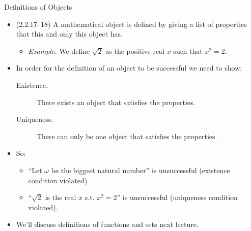 \documentclass[../slides.tex]{subfiles}
\begin{document}
\begin{frame}{Definitions of Objects}

	\begin{itemize}
	
		\item (2.2.17--18) A mathematical object is defined by giving a list of properties that this and only this object has.
		
		\begin{itemize}

		\item \emph{Example.} We define $\sqrt{2}$ as the positive real $x$ such that $x^2=2$.
		
		\end{itemize}
		
		\item In order for the definition of an object to be successful we need to show:
		
		\begin{description}
		
			\item[Existence.] There exists an object that satisfies the properties.
						
			\item[Uniqueness.] There can only be one object that satisfies the properties.
		
		\end{description}
		
		\item So:
		
			\begin{itemize}
			
				\item ``Let $\omega$ be the biggest natural number'' is unsuccessful (existence condition violated).
				
				\item ``$\sqrt{2}$ is the real $x$ s.t. $x^2=2$'' is unsuccessful (uniqueness condition violated).
			
			\end{itemize}
			
		\item We'll discuss definitions of functions and sets next lecture.
	
	\end{itemize}

\end{frame}
\end{document}
